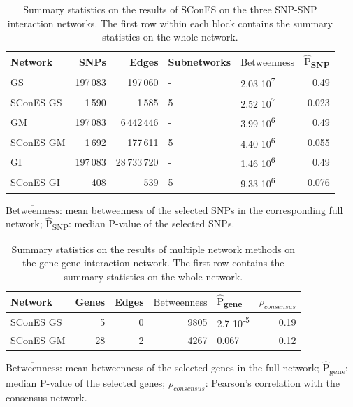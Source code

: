 \documentclass[twocolumn, 10pt]{article}
\newcommand{\mean}[1]{$\overline{\mbox{#1}}$}
\newcommand{\median}[1]{$\hat{\mbox{#1}}$}
\begin{document}
\begin{table}[htbp]
\begin{threeparttable}
\caption{\label{tab:snp_solutions}
Summary statistics on the results of SConES on the three SNP-SNP interaction networks. The first row within each block contains the summary statistics on the whole network.}
\centering
\begin{tabular}{lrrllr}
Network & SNPs & Edges & Subnetworks & \mean{Betweenness} & \median{P}\textsubscript{SNP}\\
\hline
GS & 197\,083 & 197\,060 & - & 2.03 \texttimes{} 10\textsuperscript{7} & 0.49\\
SConES GS & 1\,590 & 1\,585 & 5 & 2.52 \texttimes{} 10\textsuperscript{7} & 0.023\\
\hline
GM & 197\,083 & 6\,442\,446 & - & 3.99 \texttimes{} 10\textsuperscript{6} & 0.49\\
SConES GM & 1\,692 & 177\,611 & 5 & 4.40 \texttimes{} 10\textsuperscript{6} & 0.055\\
\hline
GI & 197\,083 & 28\,733\,720 & - & 1.46 \texttimes{} 10\textsuperscript{6} & 0.49\\
SConES GI & 408 & 539 & 5 & 9.33 \texttimes{} 10\textsuperscript{6} & 0.076\\
\end{tabular}
\begin{tablenotes}
\mean{Betweenness}: mean betweenness of the selected SNPs in the corresponding full network; \median{P}\textsubscript{SNP}: median P-value of the selected SNPs.
\end{tablenotes}
\end{threeparttable}
\end{table}

\begin{table}[htbp]
\begin{threeparttable}
  \caption{\label{tab:scones_gene_solutions}
Summary statistics on the results of multiple network methods on the gene-gene interaction network. The first row contains the summary statistics on the whole network.}
\centering
\begin{tabular}{lrrrlr}
Network & Genes & Edges & \mean{Betweenness} & \median{P}\textsubscript{gene} & $\rho_{consensus}$\\
\hline
SConES GS & 5 & 0 & 9805 & 2.7 \texttimes{} 10\textsuperscript{-5} & 0.19\\
SConES GM & 28 & 2 & 4267 & 0.067 & 0.12\\
\end{tabular}
\begin{tablenotes}
\mean{Betweenness}: mean betweenness of the selected genes in the full network; \median{P}\textsubscript{gene}: median P-value of the selected genes; $\rho_{consensus}$: Pearson's correlation with the consensus network.
\end{tablenotes}
\end{threeparttable}
\end{table}
\end{document}
